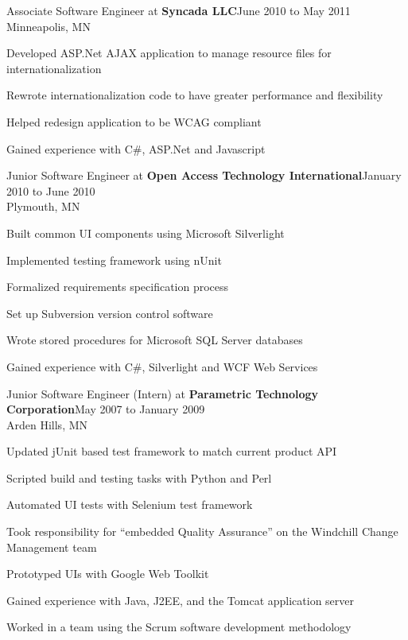 \documentclass[letterpaper]{article}
\newenvironment{resume-list}
{\begin{itemize}
 \setlength{\itemsep}{0pt}
 \setlength{\parskip}{0pt}}
{\end{itemize}}
\begin{document}
\noindent Associate Software Engineer at {\bfseries Syncada LLC}\dotfill June 2010 to May 2011\\
Minneapolis, MN
\begin{resume-list}
\item Developed ASP.Net AJAX application to manage resource files for internationalization
\item Rewrote internationalization code to have greater performance and flexibility
\item Helped redesign application to be WCAG compliant
\item Gained experience with C\#, ASP.Net and Javascript
\end{resume-list}
\pagebreak
\noindent Junior Software Engineer at {\bfseries Open Access Technology International}\dotfill January 2010 to June 2010\\
Plymouth, MN
\begin{resume-list}
\item Built common UI components using Microsoft Silverlight
\item Implemented testing framework using nUnit
\item Formalized requirements specification process
\item Set up Subversion version control software
\item Wrote stored procedures for Microsoft SQL Server databases
\item Gained experience with C\#, Silverlight and WCF Web Services
\end{resume-list}

\noindent Junior Software Engineer (Intern) at {\bfseries Parametric Technology Corporation}\dotfill May 2007 to January 2009\\
Arden Hills, MN
\begin{resume-list}
\item Updated jUnit based test framework to match current product API
\item Scripted build and testing tasks with Python and Perl
\item Automated UI tests with Selenium test framework
\item Took responsibility for ``embedded Quality Assurance'' on the Windchill Change Management team
\item Prototyped UIs with Google Web Toolkit
\item Gained experience with Java, J2EE, and the Tomcat application server
\item Worked in a team using the Scrum software development methodology
\end{resume-list}
\end{document}
